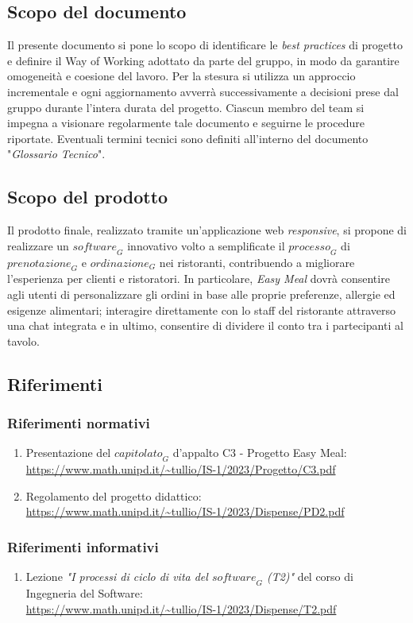 \subsection{Scopo del documento}
Il presente documento si pone lo scopo di identificare le \emph{best practices} di progetto e definire il Way of Working adottato da parte del gruppo, in modo da garantire omogeneità e coesione del lavoro. Per la stesura si utilizza un approccio incrementale e ogni aggiornamento avverrà successivamente a decisioni prese dal gruppo durante l'intera durata del progetto. Ciascun membro del team si impegna a visionare regolarmente tale documento e seguirne le procedure riportate.
Eventuali termini tecnici sono definiti all'interno del documento "\emph{Glossario Tecnico}".
\subsection{Scopo del prodotto}
Il prodotto finale, realizzato tramite un'applicazione web \emph{responsive}, si propone di realizzare un $\textit{software}_G$ innovativo volto a semplificate il $\textit{processo}_G$ di $\textit{prenotazione}_G$ e $\textit{ordinazione}_G$ nei ristoranti, contribuendo a migliorare l'esperienza per clienti e ristoratori. In particolare, \textit{Easy Meal} dovrà consentire agli utenti di personalizzare gli ordini in base alle proprie preferenze, allergie ed esigenze alimentari; interagire direttamente con lo staff del ristorante attraverso una chat integrata e in ultimo, consentire di dividere il conto tra i partecipanti al tavolo.
\subsection{Riferimenti}
\subsubsection{Riferimenti normativi}
\begin{enumerate}
    \item Presentazione del $\textit{capitolato}_G$ d'appalto C3 - Progetto Easy Meal: \\ \url{https://www.math.unipd.it/~tullio/IS-1/2023/Progetto/C3.pdf}
    \item Regolamento del progetto didattico: \\ 
    \url{https://www.math.unipd.it/~tullio/IS-1/2023/Dispense/PD2.pdf}
\end{enumerate}
\subsubsection{Riferimenti informativi}
\begin{enumerate}
    \item Lezione \emph{"I processi di ciclo di vita del $\textit{software}_G$ (T2)"} del corso di Ingegneria del Software: \\
    \url{https://www.math.unipd.it/~tullio/IS-1/2023/Dispense/T2.pdf}
\end{enumerate}